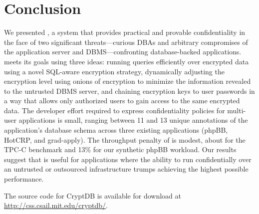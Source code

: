 \section{Conclusion}
\label{s:concl}

We presented \name{}, a system that provides practical and provable
confidentiality in the face of two significant threats---curious DBAs
and arbitrary compromises of the application server and
DBMS---confronting database-backed applications.  \name{} meets its
goals using three ideas: running queries efficiently over encrypted
data using a novel SQL-aware encryption strategy, dynamically
adjusting the encryption level using onions of encryption to minimize
the information revealed to the untrusted DBMS server, and chaining
encryption keys to user passwords in a way that allows only authorized
users to gain access to the same encrypted data.  The developer effort
required to express confidentiality policies for multi-user
applications is small, ranging between 11 and 13 unique
annotations of the application's database schema across three existing
applications (phpBB, HotCRP, and grad-apply).  The throughput penalty
of \name{} is modest, about \tput for the TPC-C benchmark and 13\%
for our synthetic phpBB workload.  Our results suggest that \name{} is
useful for applications where the ability to run confidentially over
an untrusted or outsourced infrastructure trumps achieving the highest
possible performance.

The source code for CryptDB is available for download at
\url{http://css.csail.mit.edu/cryptdb/}.


